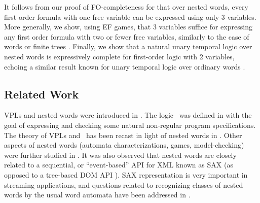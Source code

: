 \documentclass{LMCS}
\theoremstyle{plain}
\theoremstyle{definition}
\newcommand{\caret}{\text{CaRet}}
\begin{document}
It follows from our proof of FO-completeness for  that over
nested words, every first-order formula with one free variable can be
expressed using only 3 variables.  More generally, we show, using EF
games, that 3 variables suffice for expressing any first order formula
with two or fewer free variables, similarly to the case of words
\cite{IK} or finite trees \cite{marx-tods}.  Finally, we show that a
natural unary temporal logic over nested words is expressively
complete for first-order logic with 2 variables, echoing a similar
result known for unary temporal logic over ordinary words
\cite{EVW02}.


\subsection*{Related Work}  

VPLs and nested words were introduced
in \cite{VPL,nested}. The logic \caret\ was defined in  \cite{AEM04} 
with the goal of expressing
and checking some natural non-regular program specifications.  The
theory of VPLs and \caret\ has been recast in light of nested words in 
\cite{nested}.
Other aspects of nested words (automata
characterizations, games, model-checking) were further studied in
\cite{RSM,nested,AEM04,LMS04}. It was also observed that nested
words are closely related to a sequential, or ``event-based'' API for
XML known as SAX \cite{sax} (as opposed to a tree-based DOM API
\cite{dom}). SAX representation is very important in streaming
applications, and questions related to recognizing classes of nested
words by the usual word automata have been addressed in
\cite{SV02,Baranystacs}. 
\end{document}
